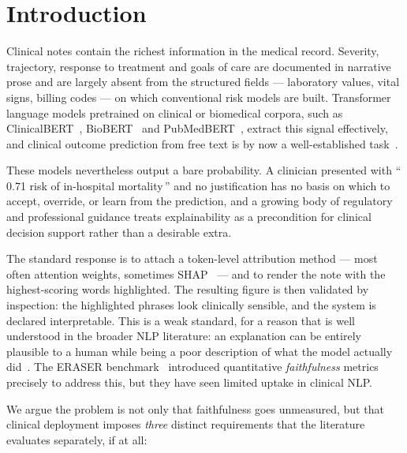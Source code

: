 \documentclass[conference]{IEEEtran}
\begin{document}
\section{Introduction}

Clinical notes contain the richest information in the medical record. Severity,
trajectory, response to treatment and goals of care are documented in narrative
prose and are largely absent from the structured fields --- laboratory values,
vital signs, billing codes --- on which conventional risk models are built.
Transformer language models pretrained on clinical or biomedical corpora, such as
ClinicalBERT~\cite{alsentzer2019}, BioBERT~\cite{lee2020} and
PubMedBERT~\cite{gu2021}, extract this signal effectively, and clinical outcome
prediction from free text is by now a well-established
task~\cite{huang2019,vanaken2021}.

These models nevertheless output a bare probability. A clinician presented with
``\,0.71 risk of in-hospital mortality\,'' and no justification has no basis on
which to accept, override, or learn from the prediction, and a growing body of
regulatory and professional guidance treats explainability as a precondition for
clinical decision support rather than a desirable extra.

The standard response is to attach a token-level attribution method --- most
often attention weights, sometimes SHAP~\cite{lundberg2017} --- and to render the
note with the highest-scoring words highlighted. The resulting figure is then
validated by inspection: the highlighted phrases look clinically sensible, and
the system is declared interpretable. This is a weak standard, for a reason that
is well understood in the broader NLP literature: an explanation can be entirely
plausible to a human while being a poor description of what the model actually
did~\cite{jain2019,wiegreffe2019}. The ERASER benchmark~\cite{deyoung2020}
introduced quantitative \emph{faithfulness} metrics precisely to address this,
but they have seen limited uptake in clinical NLP.

We argue the problem is not only that faithfulness goes unmeasured, but that
clinical deployment imposes \emph{three} distinct requirements that the
literature evaluates separately, if at all:
\end{document}
